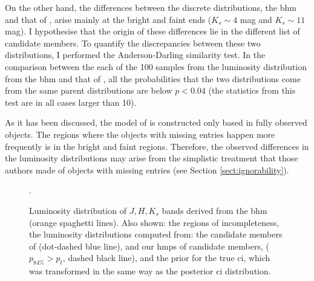 On the other hand, the differences between the discrete distributions, the \gls{bhm} and that of \citet{Bouy2015}, arise mainly at the bright and faint ends ($K_s\sim 4$ mag and $K_s\sim11$ mag). I hypothesise that the origin of these differences lie in the different list of candidate members. To quantify the discrepancies between these two distributions, I performed the Anderson-Darling similarity test. In the comparison between the each of the 100 samples from the luminosity distribution from the \gls{bhm} and that of \citet{Bouy2015}, all the probabilities that the two distributions come from the same parent distributions are below $p< 0.04$ (the statistics from this test are in all cases larger than 10).

As it has been discussed, the model of \citet{Bouy2015} is constructed only based in fully observed objects. The regions where the objects with missing entries happen more frequently is in the bright and faint regions. Therefore, the observed differences in the luminosity distributions may arise from the simplistic treatment that those authors made of objects with missing entries (see Section \ref{sect:ignorability}).

\begin{figure}[htbp]
\begin{center}
\caption{Luminosity distribution of $J,H,K_s$ bands derived from the \gls{bhm} (orange spaghetti lines). Also shown: the regions of incompleteness, the luminosity distributions computed from: the candidate members of \citet{Bouy2015} (dot-dashed blue line), and our \gls{hmps} of candidate members, ($p_{84\%}>p_t$, dashed black line), and the prior for the true \gls{ci}, which was transformed in the same way as the posterior \gls{ci} distribution.}
\label{fig:Luminosities}.
\end{center}
\end{figure}

